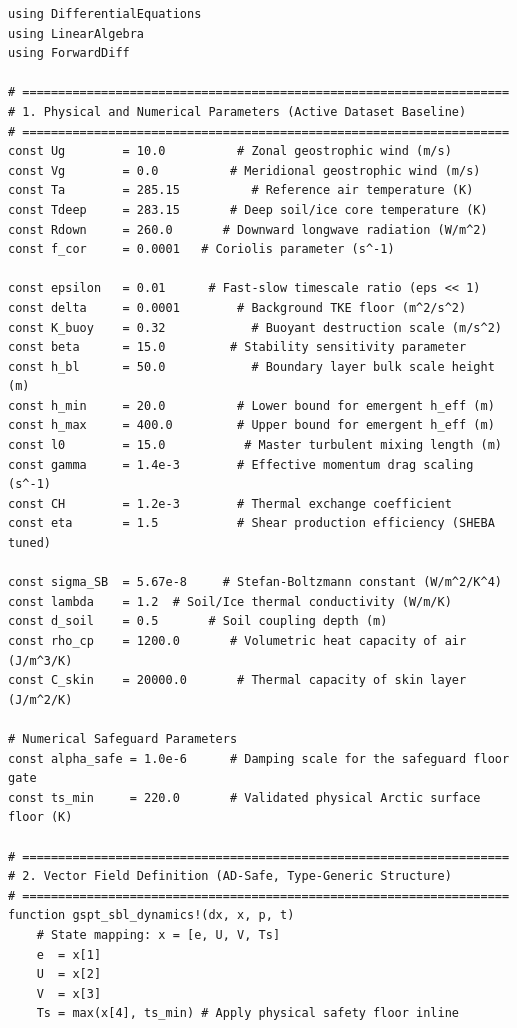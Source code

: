 \documentclass[11pt,letterpaper]{article}
\begin{document}
\begingroup
\footnotesize
\begin{verbatim}
using DifferentialEquations
using LinearAlgebra
using ForwardDiff

# ====================================================================
# 1. Physical and Numerical Parameters (Active Dataset Baseline)
# ====================================================================
const Ug        = 10.0          # Zonal geostrophic wind (m/s)
const Vg        = 0.0          # Meridional geostrophic wind (m/s)
const Ta        = 285.15          # Reference air temperature (K)
const Tdeep     = 283.15       # Deep soil/ice core temperature (K)
const Rdown     = 260.0       # Downward longwave radiation (W/m^2)
const f_cor     = 0.0001   # Coriolis parameter (s^-1)

const epsilon   = 0.01      # Fast-slow timescale ratio (eps << 1)
const delta     = 0.0001        # Background TKE floor (m^2/s^2)
const K_buoy    = 0.32            # Buoyant destruction scale (m/s^2)
const beta      = 15.0         # Stability sensitivity parameter
const h_bl      = 50.0            # Boundary layer bulk scale height (m)
const h_min     = 20.0          # Lower bound for emergent h_eff (m)
const h_max     = 400.0         # Upper bound for emergent h_eff (m)
const l0        = 15.0           # Master turbulent mixing length (m)
const gamma     = 1.4e-3        # Effective momentum drag scaling (s^-1)
const CH        = 1.2e-3        # Thermal exchange coefficient
const eta       = 1.5           # Shear production efficiency (SHEBA tuned)

const sigma_SB  = 5.67e-8     # Stefan-Boltzmann constant (W/m^2/K^4)
const lambda    = 1.2  # Soil/Ice thermal conductivity (W/m/K)
const d_soil    = 0.5       # Soil coupling depth (m)
const rho_cp    = 1200.0       # Volumetric heat capacity of air (J/m^3/K)
const C_skin    = 20000.0       # Thermal capacity of skin layer (J/m^2/K)

# Numerical Safeguard Parameters
const alpha_safe = 1.0e-6      # Damping scale for the safeguard floor gate
const ts_min     = 220.0       # Validated physical Arctic surface floor (K)

# ====================================================================
# 2. Vector Field Definition (AD-Safe, Type-Generic Structure)
# ====================================================================
function gspt_sbl_dynamics!(dx, x, p, t)
    # State mapping: x = [e, U, V, Ts]
    e  = x[1]
    U  = x[2]
    V  = x[3]
    Ts = max(x[4], ts_min) # Apply physical safety floor inline


\end{verbatim}
\end{document}
